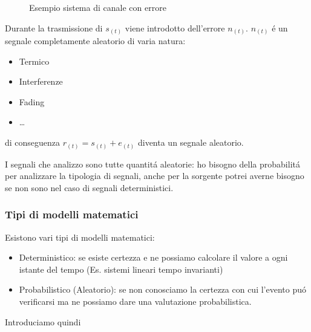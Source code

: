         \begin{figure}[H]
            \centering
            \label{fig:Sistema di comunicazione canale con errore}
            \caption{Esempio sistema di canale con errore}
        \end{figure}
        Durante la trasmissione di $s_{(t)}$ viene introdotto dell'errore $n_{(t)}$. $n_{(t)}$ é un segnale completamente aleatorio di varia 
        natura:
        \begin{itemize}
            \item {Termico}
            \item {Interferenze}
            \item {Fading}
            \item {\dots}
        \end{itemize}
        \noindent di conseguenza $r_{(t)} = s_{(t)}+e_{(t)}$ diventa un segnale aleatorio.

        I segnali che analizzo sono tutte quantitá aleatorie: ho bisogno della probabilitá per analizzare la tipologia di segnali, anche per la sorgente
        potrei averne bisogno se non sono nel caso di segnali deterministici.

        \subsubsection{Tipi di modelli matematici}
            Esistono vari tipi di modelli matematici:
            \begin{itemize}
                \item {Deterministico: se esiste certezza e ne possiamo calcolare il valore a ogni istante del tempo (Es. sistemi lineari tempo invarianti)}
                \item {Probabilistico (Aleatorio): se non conosciamo la certezza con cui l'evento puó verificarsi ma ne possiamo dare una valutazione probabilistica.}
            \end{itemize}
            Introduciamo quindi
